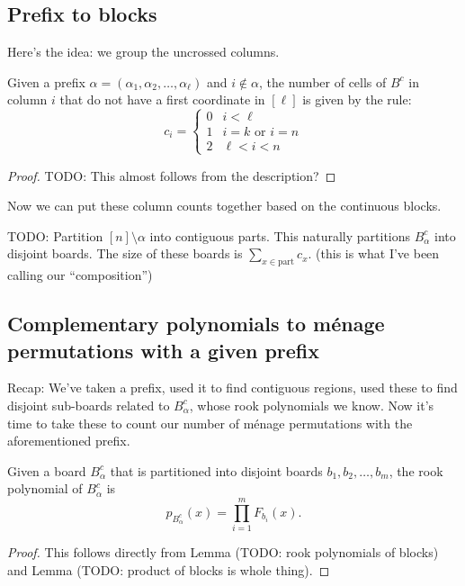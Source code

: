 \subsection{Prefix to blocks}
Here's the idea: we group the uncrossed columns.

\begin{lemma}
  Given a prefix $\alpha = (\alpha_1, \alpha_2, \dots, \alpha_\ell)$
  and $i \not\in \alpha$,
  the number of cells of $B^c$ in column $i$ that do not have
  a first coordinate in $[\ell]$
  is given by the rule:
  \begin{equation}
    c_i = \begin{cases}
      0 & i < \ell \\
      1 & i = k \text{ or } i = n \\
      2 & \ell < i < n
    \end{cases}
  \end{equation}
\end{lemma}

\begin{proof}
  TODO: This almost follows from the description?
\end{proof}

Now we can put these column counts together based on the continuous blocks.

\begin{lemma}
  TODO:
  Partition $[n] \setminus \alpha$ into contiguous parts.
  This naturally partitions $B^c_\alpha$ into disjoint boards.
  The size of these boards is $\sum_{x \in \textrm{part}} c_x$.
  (this is what I've been calling our ``composition'')
\end{lemma}



\subsection{Complementary polynomials to m\'enage permutations with a given prefix}
Recap: We've taken a prefix, used it to find contiguous regions, used these to
find disjoint sub-boards related to $B_\alpha^c$, whose rook polynomials we know.
Now it's time to take these to count our number of m\'enage permutations with
the aforementioned prefix.
\begin{lemma}
  Given a board $B_\alpha^c$ that is partitioned into disjoint boards
  $b_1, b_2, \dots, b_m$, the rook polynomial of $B_\alpha^c$ is \[
    p_{B_\alpha^c}(x) = \prod_{i = 1}^m F_{b_i}(x).
  \]
\end{lemma}
\begin{proof}
  This follows directly from Lemma (TODO: rook polynomials of blocks)
  and Lemma (TODO: product of blocks is whole thing).
\end{proof}

